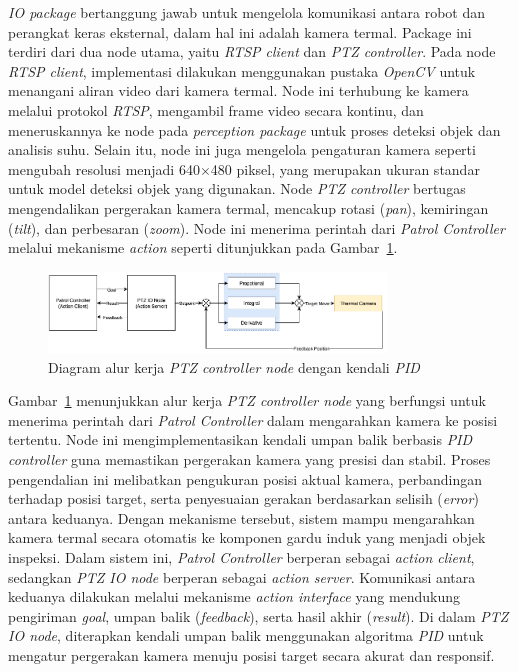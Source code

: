 \emph{IO package} bertanggung jawab untuk mengelola komunikasi antara robot dan perangkat keras eksternal, dalam hal ini adalah kamera termal. Package ini terdiri dari dua node utama, yaitu \emph{RTSP client} dan \emph{PTZ controller}.  Pada node \emph{RTSP client}, implementasi dilakukan menggunakan pustaka \emph{OpenCV} untuk menangani aliran video dari kamera termal. Node ini terhubung ke kamera melalui protokol \emph{RTSP}, mengambil frame video secara kontinu, dan meneruskannya ke node pada \emph{perception package} untuk proses deteksi objek dan analisis suhu. Selain itu, node ini juga mengelola pengaturan kamera seperti mengubah resolusi menjadi 640$\times$480 piksel, yang merupakan ukuran standar untuk model deteksi objek yang digunakan. Node \emph{PTZ controller} bertugas mengendalikan pergerakan kamera termal, mencakup rotasi (\emph{pan}), kemiringan (\emph{tilt}), dan perbesaran (\emph{zoom}). Node ini menerima perintah dari \emph{Patrol Controller} melalui mekanisme \emph{action}  seperti ditunjukkan pada Gambar~\ref{fig:ptz-control}.

\begin{figure}[H]
  \centering
  \includegraphics[width=0.8\textwidth]{gambar/bab3/ptz-control.png}
  \caption{Diagram alur kerja \emph{PTZ controller node} dengan kendali \emph{PID}}
  \label{fig:ptz-control}
\end{figure}

Gambar~\ref{fig:ptz-control} menunjukkan alur kerja \emph{PTZ controller node} yang berfungsi untuk menerima perintah dari \emph{Patrol Controller} dalam mengarahkan kamera ke posisi tertentu. Node ini mengimplementasikan kendali umpan balik berbasis \emph{PID controller} guna memastikan pergerakan kamera yang presisi dan stabil. Proses pengendalian ini melibatkan pengukuran posisi aktual kamera, perbandingan terhadap posisi target, serta penyesuaian gerakan berdasarkan selisih (\emph{error}) antara keduanya. Dengan mekanisme tersebut, sistem mampu mengarahkan kamera termal secara otomatis ke komponen gardu induk yang menjadi objek inspeksi. Dalam sistem ini, \emph{Patrol Controller} berperan sebagai \emph{action client}, sedangkan \emph{PTZ IO node} berperan sebagai \emph{action server}. Komunikasi antara keduanya dilakukan melalui mekanisme \emph{action interface} yang mendukung pengiriman \emph{goal}, umpan balik (\emph{feedback}), serta hasil akhir (\emph{result}). Di dalam \emph{PTZ IO node}, diterapkan kendali umpan balik menggunakan algoritma \emph{PID} untuk mengatur pergerakan kamera menuju posisi target secara akurat dan responsif.

